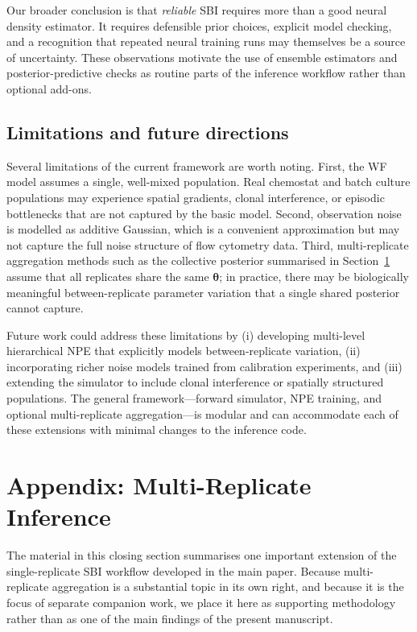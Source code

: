 \documentclass[11pt]{article}
\newcommand{\btheta}{\boldsymbol{\theta}}
\begin{document}
Our broader conclusion is that \emph{reliable} SBI requires more than a good
neural density estimator.
It requires defensible prior choices, explicit model checking, and a
recognition that repeated neural training runs may themselves be a source of
uncertainty.
These observations motivate the use of ensemble estimators and
posterior-predictive checks as routine parts of the inference workflow rather
than optional add-ons.

\subsection{Limitations and future directions}

Several limitations of the current framework are worth noting.
First, the WF model assumes a single, well-mixed population.
Real chemostat and batch culture populations may experience spatial gradients,
clonal interference, or episodic bottlenecks that are not captured by the
basic model.
Second, observation noise is modelled as additive Gaussian, which is a
convenient approximation but may not capture the full noise structure of flow
cytometry data.
Third, multi-replicate aggregation methods such as the collective posterior
summarised in Section~\ref{sec:collective} assume that all replicates share
the same $\btheta$; in practice, there may be biologically meaningful
between-replicate parameter variation that a single shared posterior cannot
capture.

Future work could address these limitations by (i) developing multi-level
hierarchical NPE that explicitly models between-replicate variation,
(ii) incorporating richer noise models trained from calibration experiments,
and (iii) extending the simulator to include clonal interference or
spatially structured populations.
The general framework---forward simulator, NPE training, and optional
multi-replicate aggregation---is modular and can accommodate each of these extensions with
minimal changes to the inference code.

\section{Appendix: Multi-Replicate Inference}
\label{sec:collective}

The material in this closing section summarises one important extension of
the single-replicate SBI workflow developed in the main paper.
Because multi-replicate aggregation is a substantial topic in its own right,
and because it is the focus of separate companion work, we place it here as
supporting methodology rather than as one of the main findings of the
present manuscript.
\end{document}
